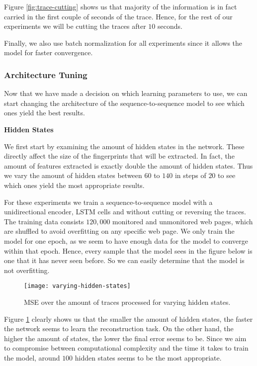 Figure \ref{fig:trace-cutting} shows us that majority of the information is in fact carried in the first couple of seconds of the trace.
Hence, for the rest of our experiments we will be cutting the traces after $10$ seconds.

Finally, we also use batch normalization for all experiments since it allows the model for faster convergence.

\subsubsection{Architecture Tuning}

Now that we have made a decision on which learning parameters to use, we can start changing the architecture of the sequence-to-sequence model to see which ones yield the best results.

\noindent
\textbf{Hidden States}

We first start by examining the amount of hidden states in the network.
These directly affect the size of the fingerprints that will be extracted.
In fact, the amount of features extracted is exactly double the amount of hidden states.
Thus we vary the amount of hidden states between $60$ to $140$ in steps of $20$ to see which ones yield the most appropriate results.

For these experiments we train a sequence-to-sequence model with a unidirectional encoder, LSTM cells and without cutting or reversing the traces.
The training data consists $120,000$ monitored and unmonitored web pages, which are shuffled to avoid overfitting on any specific web page.
We only train the model for one epoch, as we seem to have enough data for the model to converge within that epoch.
Hence, every sample that the model sees in the figure below is one that it has never seen before.
So we can easily determine that the model is not overfitting.

\begin{figure}[ht]
  \centering
  \texttt{[image: varying-hidden-states]}
  \caption{MSE over the amount of traces processed for varying hidden states.}
  \label{fig:varying-hidden-states}
\end{figure}

Figure \ref{fig:varying-hidden-states} clearly shows us that the smaller the amount of hidden states, the faster the network seems to learn the reconstruction task.
On the other hand, the higher the amount of states, the lower the final error seems to be.
Since we aim to compromise between computational complexity and the time it takes to train the model, around $100$ hidden states seems to be the most appropriate.

